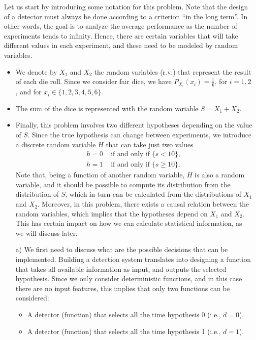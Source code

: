 \begin{solution}
Let us start by introducing some notation for this problem. Note that the design of a detector must always be done according to a criterion ``in the long term''. In other words, the goal is to analyze the average performance as the number of experiments tends to infinity. Hence, there are certain variables that will take different values in each experiment, and these need to be modeled by random variables.

    \begin{itemize}
    \item We denote by $X_1$ and $X_2$ the random variables (r.v.) that represent the result of each die roll. Since we consider fair dice, we have $P_{X_i}(x_i) = \frac{1}{6}$, for $i=1,2$, and for $x_i \in \{1, 2, 3, 4, 5, 6\}$.
    \item The sum of the dice is represented with the random variable $S = X_1 + X_2$.
    \item Finally, this problem involves two different hypotheses depending on the value of $S$. Since the true hypothesis can change between experiments, we introduce a discrete random variable $H$ that can take just two values
    \begin{align}
    h=0 & \text{~if and only if } \{s<10\}, \nonumber \\
    h=1 & \text{~if and only if } \{s\geq10\}. \nonumber
    \end{align}
    Note that, being a function of another random variable, $H$ is also a random variable, and it should be possible to compute its distribution from the distribution of $S$, which in turn can be calculated from the distributions of $X_1$ and $X_2$. Moreover, in this problem, there exists a causal relation between the random variables, which implies that the hypotheses depend on $X_1$ and $X_2$. This has certain impact on how we can calculate statistical information, as we will discuss later.

    \end{itemize}
    

\begin{itemize}
    \item [a)] We first need to discuss what are the possible decisions that can be implemented. Building a detection system translates into designing a function that takes all available information as input, and outputs the selected hypothesis. Since we only consider deterministic functions, and in this case there are no input features, this implies that only two functions can be considered:
    \begin{itemize}
        \item A detector (function) that selects all the time hypothesis 0 (i.e., $d=0$).
        \item A detector (function) that selects all the time hypothesis 1 (i.e., $d=1$).
    \end{itemize}
    

\end{itemize}
\end{solution}
